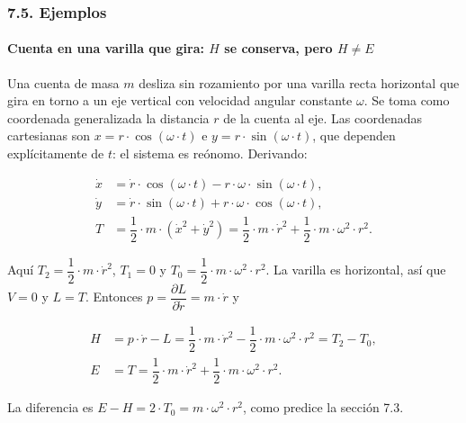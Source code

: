 \documentclass[
  spanish,
]{article}
\begin{document}
\subsubsection{7.5. Ejemplos}\label{ejemplos}

\paragraph{\texorpdfstring{Cuenta en una varilla que gira: \(H\) se
conserva, pero
\(H \neq E\)}{Cuenta en una varilla que gira: H se conserva, pero H \textbackslash neq E}}\label{cuenta-en-una-varilla-que-gira-h-se-conserva-pero-h-neq-e}

Una cuenta de masa \(m\) desliza sin rozamiento por una varilla recta
horizontal que gira en torno a un eje vertical con velocidad angular
constante \(\omega\). Se toma como coordenada generalizada la distancia
\(r\) de la cuenta al eje. Las coordenadas cartesianas son
\(x = r \cdot \cos(\omega \cdot t)\) e
\(y = r \cdot \sin(\omega \cdot t)\), que dependen explícitamente de
\(t\): el sistema es reónomo. Derivando:

\[
\begin{aligned}
\dot{x} &= \dot{r} \cdot \cos(\omega \cdot t) - r \cdot \omega \cdot \sin(\omega \cdot t), \\
\dot{y} &= \dot{r} \cdot \sin(\omega \cdot t) + r \cdot \omega \cdot \cos(\omega \cdot t), \\
T &= \dfrac{1}{2} \cdot m \cdot (\dot{x}^2 + \dot{y}^2) = \dfrac{1}{2} \cdot m \cdot \dot{r}^2 + \dfrac{1}{2} \cdot m \cdot \omega^2 \cdot r^2.
\end{aligned}
\]

Aquí \(T_2 = \dfrac{1}{2} \cdot m \cdot \dot{r}^2\), \(T_1 = 0\) y
\(T_0 = \dfrac{1}{2} \cdot m \cdot \omega^2 \cdot r^2\). La varilla es
horizontal, así que \(V = 0\) y \(L = T\). Entonces
\(p = \dfrac{\partial L}{\partial \dot{r}} = m \cdot \dot{r}\) y

\[
\begin{aligned}
H &= p \cdot \dot{r} - L = \dfrac{1}{2} \cdot m \cdot \dot{r}^2 - \dfrac{1}{2} \cdot m \cdot \omega^2 \cdot r^2 = T_2 - T_0, \\
E &= T = \dfrac{1}{2} \cdot m \cdot \dot{r}^2 + \dfrac{1}{2} \cdot m \cdot \omega^2 \cdot r^2.
\end{aligned}
\]

La diferencia es \(E - H = 2 \cdot T_0 = m \cdot \omega^2 \cdot r^2\),
como predice la sección 7.3.
\end{document}
